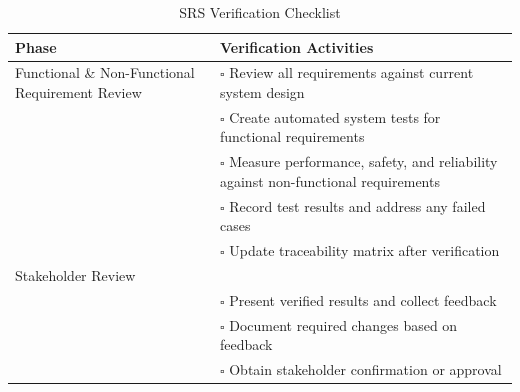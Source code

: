 \documentclass[12pt, titlepage]{article}
\begin{document}
\begin{table}[H]
  \centering
  \caption{SRS Verification Checklist}
  \label{tab:srs_verification_checklist}
  \renewcommand{\arraystretch}{1.3}
  \setlength{\tabcolsep}{8pt}
  \begin{tabular}{|p{4.4cm}|p{10.1cm}|}
    \hline
    \textbf{Phase}                                  & \textbf{Verification Activities}                                                              \\ \hline

    Functional \& Non-Functional Requirement Review & $\square$ \; Review all
    requirements against current system design                                                                                                      \\[-2pt]
                                                    & $\square$ \; Create automated system tests for functional requirements                        \\[-2pt]
                                                    & $\square$ \; Measure performance, safety, and reliability against non-functional requirements \\[-2pt]
                                                    & $\square$ \; Record test results and address any failed cases                                 \\[-2pt]
                                                    & $\square$ \; Update traceability matrix after verification                                    \\ \hline

    Stakeholder Review                                                                                                                              \\[-2pt]
                                                    & $\square$ \; Present verified results and collect feedback                                    \\[-2pt]
                                                    & $\square$ \; Document required changes based on feedback                                      \\[-2pt]
                                                    & $\square$ \; Obtain stakeholder confirmation or approval                                      \\ \hline


\end{tabular}
\end{table}
\end{document}
